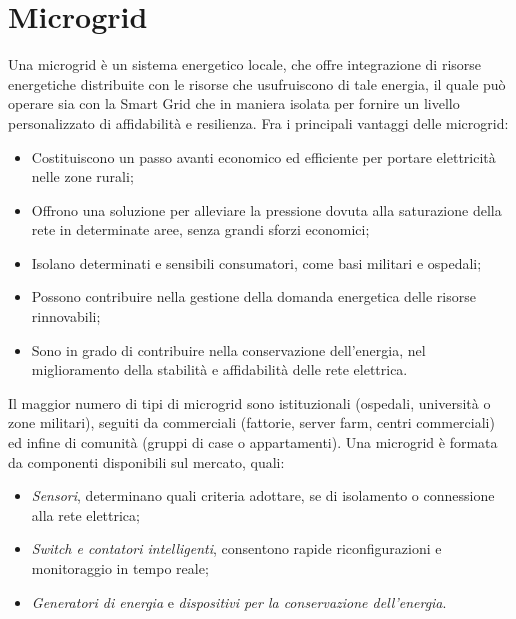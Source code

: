 \section{Microgrid}
Una microgrid è un sistema energetico locale, che offre integrazione di risorse energetiche    distribuite con le risorse che usufruiscono di tale energia, il quale può operare sia con la Smart Grid che in maniera isolata per fornire un livello personalizzato di affidabilità e resilienza. 
Fra i principali vantaggi delle microgrid:
\begin{itemize}
	\item Costituiscono un passo avanti economico ed efficiente per portare elettricità nelle zone rurali;
	\item Offrono una soluzione per alleviare la pressione dovuta alla saturazione della rete in determinate aree, senza grandi sforzi economici;
	\item Isolano determinati e sensibili consumatori, come basi militari e ospedali;
	\item Possono contribuire nella gestione della domanda energetica delle risorse rinnovabili;
	\item Sono in grado di contribuire nella conservazione dell'energia, nel miglioramento della stabilità e affidabilità delle rete elettrica.	  
\end{itemize}
Il maggior numero di tipi di microgrid sono istituzionali (ospedali, università o zone militari), seguiti da commerciali (fattorie, server farm, centri commerciali) ed infine di comunità (gruppi di case o appartamenti).  
Una microgrid è formata da componenti disponibili sul mercato, quali:
\begin{itemize}
	\item \emph{Sensori}, determinano quali criteria adottare, se di isolamento o connessione alla rete elettrica;
	\item \emph{Switch e contatori intelligenti}, consentono rapide riconfigurazioni e monitoraggio in tempo reale;
	\item \emph{Generatori di energia} e \emph{dispositivi per la conservazione dell'energia}.   
\end{itemize}

